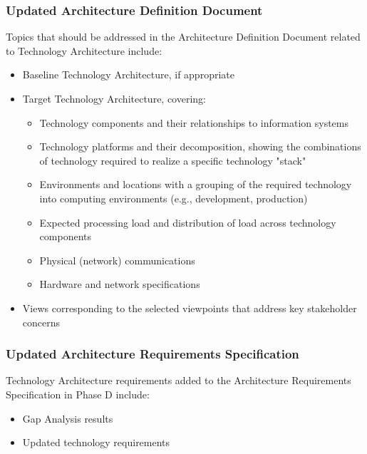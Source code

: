 \documentclass[aspectratio=169, table]{beamer}
\begin{document}
	
	
	\begin{frame}
		\frametitle{Updated Architecture Definition Document}
		\vspace{15pt}
		Topics that should be addressed in the Architecture Definition Document related to Technology Architecture include:
		\begin{itemize}
			\item Baseline Technology Architecture, if appropriate
			\item Target Technology Architecture, covering:
			\begin{itemize}
				\item Technology components and their relationships to information systems
				\item Technology platforms and their decomposition, showing the combinations of technology required to realize a specific technology "stack"
				\item Environments and locations with a grouping of the required technology into computing environments (e.g., development, production)
				\item Expected processing load and distribution of load across technology components
				\item Physical (network) communications
				\item Hardware and network specifications
			\end{itemize}
			\item Views corresponding to the selected viewpoints that address key stakeholder concerns
		\end{itemize}
	\end{frame}
	
	\begin{frame}
		\frametitle{\LARGE{Updated Architecture Requirements Specification}}
		
		Technology Architecture requirements added to the Architecture Requirements Specification in Phase D include:
		\begin{itemize}
			\item Gap Analysis results
			\item Updated technology requirements
		\end{itemize}
	\end{frame}
	
\end{document}
